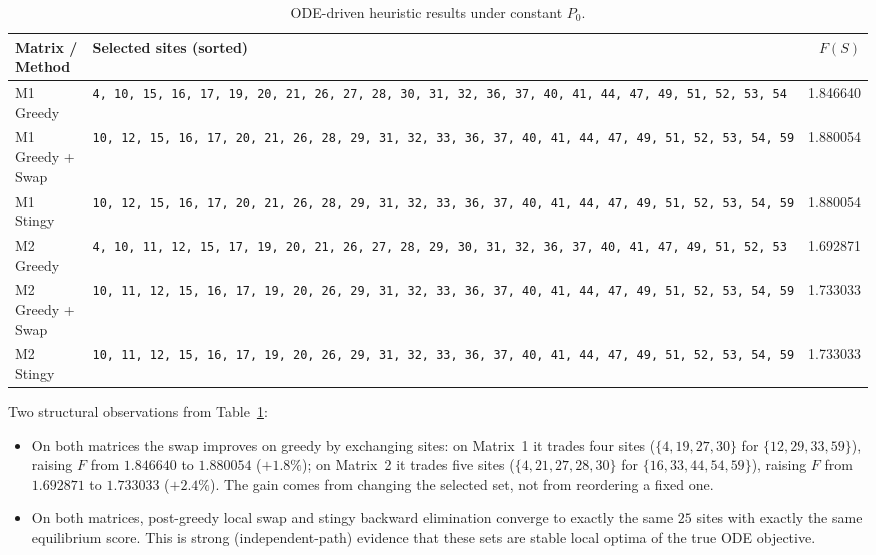 \documentclass[11pt]{article}
\begin{document}
\begin{table}[H]
\centering
\caption{ODE-driven heuristic results under constant $P_0$.}
\label{tab:heur-const}
\small
\begin{tabularx}{\linewidth}{@{}l X r@{}}
\toprule
\textbf{Matrix / Method} & \textbf{Selected sites (sorted)} & \textbf{$F(S)$} \\
\midrule
M1 Greedy & \texttt{4,\ 10,\ 15,\ 16,\ 17,\ 19,\ 20,\ 21,\ 26,\ 27,\ 28,\ 30,\ 31,\ 32,\ 36,\ 37,\ 40,\ 41,\ 44,\ 47,\ 49,\ 51,\ 52,\ 53,\ 54} & 1.846640 \\
M1 Greedy + Swap & \texttt{10,\ 12,\ 15,\ 16,\ 17,\ 20,\ 21,\ 26,\ 28,\ 29,\ 31,\ 32,\ 33,\ 36,\ 37,\ 40,\ 41,\ 44,\ 47,\ 49,\ 51,\ 52,\ 53,\ 54,\ 59} & 1.880054 \\
M1 Stingy & \texttt{10,\ 12,\ 15,\ 16,\ 17,\ 20,\ 21,\ 26,\ 28,\ 29,\ 31,\ 32,\ 33,\ 36,\ 37,\ 40,\ 41,\ 44,\ 47,\ 49,\ 51,\ 52,\ 53,\ 54,\ 59} & 1.880054 \\
\midrule
M2 Greedy & \texttt{4,\ 10,\ 11,\ 12,\ 15,\ 17,\ 19,\ 20,\ 21,\ 26,\ 27,\ 28,\ 29,\ 30,\ 31,\ 32,\ 36,\ 37,\ 40,\ 41,\ 47,\ 49,\ 51,\ 52,\ 53} & 1.692871 \\
M2 Greedy + Swap & \texttt{10,\ 11,\ 12,\ 15,\ 16,\ 17,\ 19,\ 20,\ 26,\ 29,\ 31,\ 32,\ 33,\ 36,\ 37,\ 40,\ 41,\ 44,\ 47,\ 49,\ 51,\ 52,\ 53,\ 54,\ 59} & 1.733033 \\
M2 Stingy & \texttt{10,\ 11,\ 12,\ 15,\ 16,\ 17,\ 19,\ 20,\ 26,\ 29,\ 31,\ 32,\ 33,\ 36,\ 37,\ 40,\ 41,\ 44,\ 47,\ 49,\ 51,\ 52,\ 53,\ 54,\ 59} & 1.733033 \\
\bottomrule
\end{tabularx}
\end{table}

Two structural observations from Table~\ref{tab:heur-const}:

\begin{itemize}[leftmargin=1.4em, itemsep=0.2em]
  \item On both matrices the swap improves on greedy by exchanging sites: on Matrix~1 it trades four sites ($\{4,19,27,30\}$ for $\{12,29,33,59\}$), raising $F$ from $1.846640$ to $1.880054$ ($+1.8\%$); on Matrix~2 it trades five sites ($\{4,21,27,28,30\}$ for $\{16,33,44,54,59\}$), raising $F$ from $1.692871$ to $1.733033$ ($+2.4\%$). The gain comes from changing the selected set, not from reordering a fixed one.
  \item On both matrices, post-greedy local swap and stingy backward elimination converge to exactly the same $25$ sites with exactly the same equilibrium score. This is strong (independent-path) evidence that these sets are stable local optima of the true ODE objective.
\end{itemize}
\end{document}
